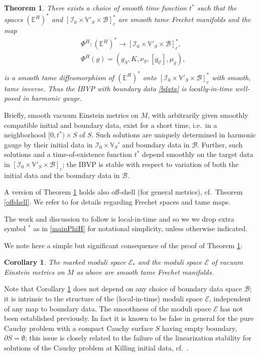 \documentclass[10pt]{amsart}
\newcommand{\cC}{{\mathcal C}}
\newcommand{\cB}{{\mathcal B}}
\newcommand{\cE}{{\mathcal E}}
\newcommand{\cI}{\mathcal I}
\newcommand{\bE}{\mathbb E}
\newcommand{\bV}{\mathbb V}
\newcommand{\be}{\begin{equation}}
\newcommand{\ee}{\end{equation}}
\newcommand{\p}{\partial}
\renewcommand{\to}{\rightarrow}
\newcommand{\<}{\langle}
\renewcommand{\>}{\rangle}
\theoremstyle{plain}
\newtheorem{theorem}[lemma]{Theorem}
\newtheorem{corollary}[lemma]{Corollary}
\theoremstyle{remark}
\theoremstyle{definition}
\numberwithin{equation}{section}
\begin{document}
\begin{theorem} \label{mainthm}
There exists a choice of smooth time function $t^*$ such that the spaces $(\bE^H)^*$ and $[\cI_0 \times \bV'_S \times \cB]_c^*$ are smooth tame 
Frechet manifolds and the map 
\be \label{mainPhiH}
\begin{split}
&\Phi^H: (\bE^H)^* \to [\cI_0 \times \bV'_S \times \cB]_c^*,\\
&\Phi^H(g) = (g_S, K, \nu_S, [g_{\cC}], \mu_g),\\
\end{split}
\ee
is a smooth tame diffeomorphism of $(\bE^H)^*$ onto $[\cI_0 \times \bV'_S \times \cB]_c^*$ with smooth, tame inverse. Thus the IBVP with 
boundary data \eqref{bdata} is locally-in-time well-posed in harmonic gauge. 

\end{theorem}

  Briefly, smooth vacuum Einstein metrics on $M$, with arbitrarily given smoothly compatible initial and boundary data, exist for a short time, i.e.~in a 
neighborhood $[0, t^*)\times S$ of $S$. Such solutions are uniquely determined in harmonic gauge by their initial data in 
$\cI_0 \times \bV_S'$ and boundary data in $\cB$. Further, such solutions and a time-of-existence function $t^*$ depend smoothly on the 
target data in $[\cI_0 \times \bV'_S \times \cB]_c$; the IBVP is stable with respect to variation of both the initial data and the 
boundary data in $\cB$. 

A version of Theorem \ref{mainthm} holds also off-shell (for general metrics), cf.~Theorem \ref{offshell}. We refer to \cite{Ham} for details 
regarding Frechet spaces and tame maps. 

   The work and discussion to follow is local-in-time and so we we drop extra symbol $^*$ as in \eqref{mainPhiH} for notational simplicity, unless otherwise indicated. 
   
  We note here a simple but significant consequence of the proof of Theorem \ref{mainthm}:
  
  \begin{corollary} \label{Eman}
  The marked moduli space $\cE_*$ and the moduli space $\cE$ of vacuum Einstein metrics on $M$ as above are smooth tame Frechet manifolds. 
  \end{corollary} 
    
    Note that Corollary \ref{Eman} does not depend on any choice of boundary data space $\cB$; it is intrinsic to the structure of the (local-in-time) 
moduli space $\cE$, independent of any map to boundary data. The smoothness of the moduli space $\cE$ has not been established previously. In fact it is known 
to be false in general for the pure Cauchy problem with a compact Cauchy surface $S$ having empty boundary, $\p S = \emptyset$; this issue is closely related 
to the failure of the linearization stability for solutions of the Cauchy problem at Killing initial data, cf.~\cite{Mon}. 
\end{document}
